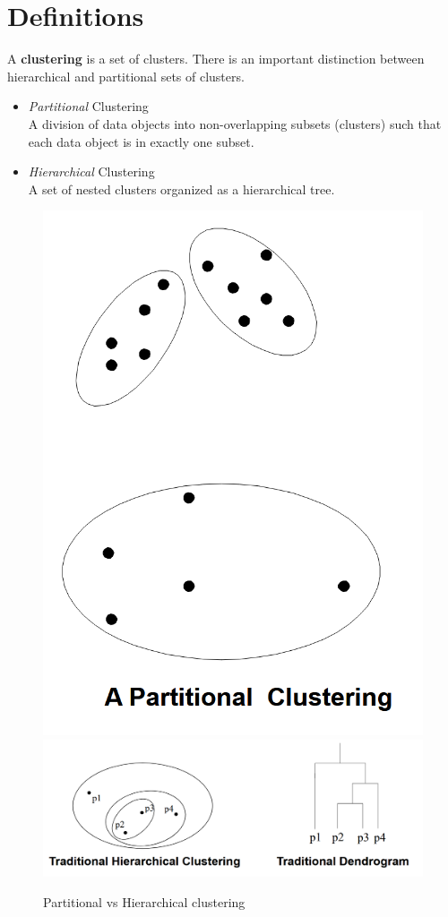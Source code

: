 \section{Definitions}
A \textbf{clustering} is a set of clusters. There is an important distinction between hierarchical and
partitional sets of clusters.
\begin{itemize}
	\item \textit{Partitional} Clustering\\
	A division of data objects into non-overlapping subsets
	(clusters) such that each data object is in exactly one subset.
	\item \textit{Hierarchical} Clustering\\
	A set of nested clusters organized as a hierarchical tree.
\end{itemize}

\begin{figure}[htbp]
	\centering
	\includegraphics[width=0.33\columnwidth]{images/04/partitional.png}
	\includegraphics[width=0.66\columnwidth]{images/04/hierarchical.png}
	\caption{Partitional vs Hierarchical clustering}
	\label{fig:04/partitional_hierarchical}
\end{figure}


